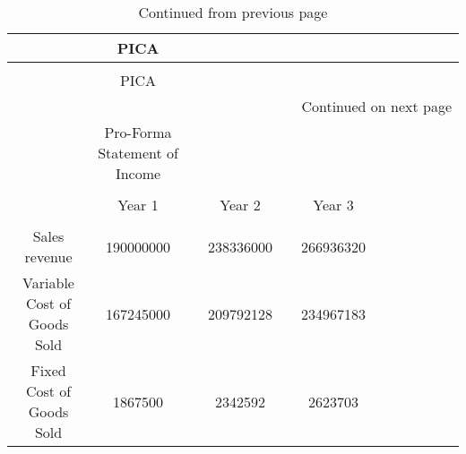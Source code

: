 {
\small
\begin{longtable}[c]{|c|c|c|c|c|c|c|c|c|c|c|c|}
\caption{default\label{EMeterCost.tex}}\\
\hline
\rowcolor{blue}
 & PICA &  &  &  &  &  &  &  &  &  &  \\
\hline
\endfirsthead
\caption[]{Continued from previous page}\\

\hline
\rowcolor{blue}
 & PICA &  &  &  &  &  &  &  &  &  &  \\
\hline
\endhead
\multicolumn{12}{r}{{Continued on next page}} \\
\endfoot

\endlastfoot
                                                                                                                                & Pro-Forma Statement of Income     &  &              &  &           &  &           &  &           &  &           \\
\hline
                                                                                                                                &                                   &  &              &  &           &  &           &  &           &  &           \\
\hline
                                                                                                                                & Year 1                            &  & Year 2       &  & Year 3    &  &           &  &           &  &           \\
\hline
                                                                                                                                &                                   &  &              &  &           &  &           &  &           &  &           \\
\hline
Sales revenue                                                                                                                   & 190000000                         &  & 238336000    &  & 266936320 &  &           &  &           &  &           \\
\hline
Variable Cost of Goods Sold                                                                                                     & 167245000                         &  & 209792128    &  & 234967183 &  &           &  &           &  &           \\
\hline
Fixed Cost of Goods Sold                                                                                                        & 1867500                           &  & 2342592      &  & 2623703   &  &           &  &           &  &           \\

\end{longtable}}
